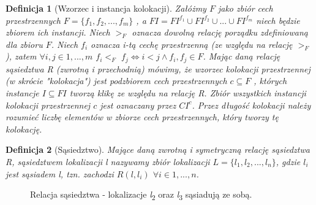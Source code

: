 \documentclass[12pt]{article}
\newtheorem{defin}{Definicja}
\begin{document}
\begin{defin}[Wzorzec i instancja kolokacji]
Załóżmy $F$ jako zbiór cech przestrzennych $F = \{ f_{1}, f_{2}, ...,f_{m} \} $ , a $FI = FI^{f_{1}} \cup FI^{f_{2}} \cup ... \cup FI^{f_{m}}$ niech będzie
zbiorem ich instancji. Niech $ >_{F} $ oznacza dowolną relację porządku zdefiniowaną dla zbioru $ F $. Niech $ f_{i} $ oznacza i-tą cechę przestrzenną (ze względu na relację $ >_{F} $), zatem $ \forall i,j \in 1,...,m $ $ f_{i} <_{F} $ $ f_{j} \Leftrightarrow i < j \land f_{i},f_{j} \in F $. Mając daną relację sąsiedztwa R (zwrotną i przechodnią) mówimy, że wzorzec kolokacji przestrzennej (w skrócie "kolokacja") jest podzbiorem cech przestrzennych $ c \subseteq F $ , których instancje $ I\subseteq FI $ tworzą klikę ze względu na relację R. Zbiór wszystkich instancji kolokacji przestrzennej $c$ jest oznaczany przez $CI^{c} $. Przez długość kolokacji należy rozumieć liczbę elementów w zbiorze cech przestrzennych, który tworzy tę kolokację.
\end{defin}

\begin{defin}[Sąsiedztwo]
Mające daną zwrotną i symetryczną relację sąsiedztwa R, sąsiedztwem lokalizacji l nazywamy zbiór lokalizacji $L = \{l_{1},l_{2}, . . . , l_{n}\}$, gdzie $l_{i}$ jest sąsiadem l, tzn. zachodzi $R(l, l_{i}) $ $ \forall i \in 1,...,n$.
\end{defin}

\begin{figure}
\centering
{}
\caption{Relacja sąsiedztwa - lokalizacje \textit{l}\textsubscript{2} oraz \textit{l}\textsubscript{3} sąsiadują ze sobą.}
\end{figure}
\end{document}
